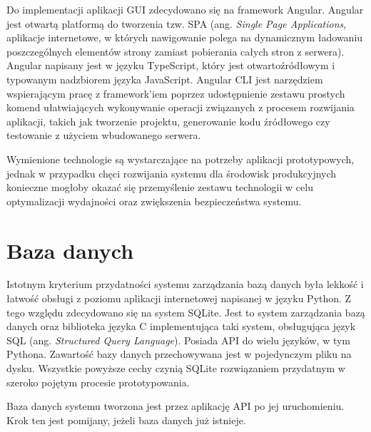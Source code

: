 		Do implementacji aplikacji GUI zdecydowano się na framework Angular. Angular jest otwartą platformą do tworzenia tzw. SPA (ang. \textit{Single Page Applications}, aplikacje internetowe, w których nawigowanie polega na dynamicznym ładowaniu poszczególnych elementów strony zamiast pobierania całych stron z serwera). Angular napisany jest w języku TypeScript, który jest otwartoźródłowym i typowanym nadzbiorem języka JavaScript. Angular CLI jest narzędziem wspierającym pracę z framework'iem poprzez udostępnienie zestawu prostych komend ułatwiających wykonywanie operacji związanych z procesem rozwijania aplikacji, takich jak tworzenie projektu, generowanie kodu źródłowego czy testowanie z użyciem wbudowanego serwera.

		Wymienione technologie są wystarczające na potrzeby aplikacji prototypowych, jednak w przypadku chęci rozwijania systemu dla środowisk produkcyjnych konieczne mogłoby okazać się przemyślenie zestawu technologii w celu optymalizacji wydajności oraz zwiększenia bezpieczeństwa systemu.

    \section{Baza danych}

    	Istotnym kryterium przydatności systemu zarządzania bazą danych była lekkość i łatwość obsługi z poziomu aplikacji internetowej napisanej w języku Python. Z tego względu zdecydowano się na system SQLite. Jest to system zarządzania bazą danych oraz biblioteka języka C implementująca taki system, obsługująca język SQL (ang. \textit{Structured Query Language}). Posiada API do wielu języków, w tym Pythona. Zawartość bazy danych przechowywana jest w pojedynczym pliku na dysku. Wszystkie powyższe cechy czynią SQLite rozwiązaniem przydatnym w szeroko pojętym procesie prototypowania.

    	Baza danych systemu tworzona jest przez aplikację API po jej uruchomieniu. Krok ten jest pomijany, jeżeli baza danych już istnieje.